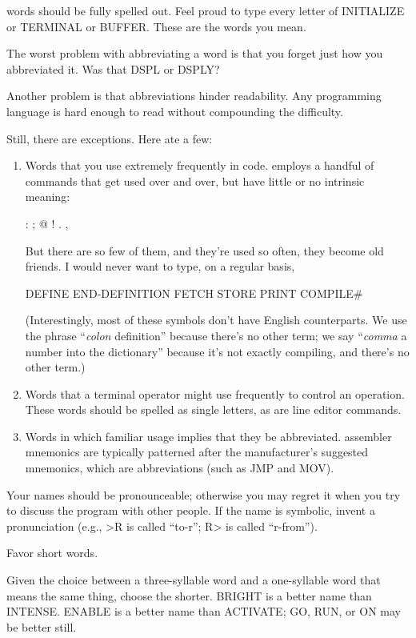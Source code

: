 \Forth{} words should be fully spelled out.  Feel proud to type every
letter of INITIALIZE or TERMINAL or BUFFER.  These are the words
you mean.

The worst problem with abbreviating a word is that you forget just
how you abbreviated it.  Was that DSPL or DSPLY?

Another problem is that abbreviations hinder readability.
Any programming language is hard enough to read without compounding
the difficulty.

Still, there are exceptions.  Here ate a few:
\begin{enumerate}
\item Words that you use extremely frequently in code. \Forth{} employs a handful
of commands that get used over and over, but have little or no intrinsic
meaning:
\begin{Code}
:   ;   @   !   .   ,
\end{Code}
But there are so few of them, and they're used so often, they become old
friends.  I would never want to type, on a regular basis,
\begin{Code}
DEFINE  END-DEFINITION  FETCH  STORE  PRINT  COMPILE#
\end{Code}
(Interestingly, most of these symbols don't have English counterparts.  We
use the phrase ``\emph{colon} definition'' because there's no other term; we say
``\emph{comma} a number into the dictionary'' because it's not exactly compiling,
and there's no other term.)
\item Words that a terminal operator might use frequently to control an operation.
These words should be spelled as single letters, as are line editor
commands.
\item Words in which familiar usage implies that they be abbreviated.  \Forth{}
assembler mnemonics are typically patterned after the manufacturer's suggested
mnemonics, which are abbreviations (such as JMP and MOV).
\end{enumerate}
Your names should be pronounceable; otherwise you may regret it when
you try to discuss the program with other people.  If the name is symbolic,
invent a pronunciation (e.g., >R is called ``to-r''; R> is called
``r-from'').

\begin{tip}
Favor short words.
\end{tip}
Given the choice between a three-syllable word and a one-syllable word
that means the same thing, choose the shorter.  BRIGHT is a better name
than INTENSE.  ENABLE is a better name than ACTIVATE; GO,
RUN, or ON may be better still.

